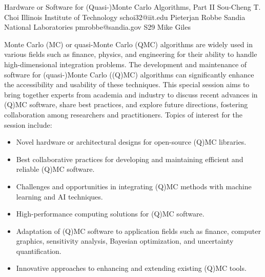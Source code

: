 \begin{session}
 {Hardware or Software for (Quasi-)Monte Carlo Algorithms, Part II}%
 {Sou-Cheng T.  Choi}%
 {Illinois Institute of Technology}%
 {schoi32@iit.edu}%
 {Pieterjan Robbe}%
 {Sandia National Laboratories}%
 {pmrobbe@sandia.gov}%
 {S29}%
 {Mike Giles}%

 Monte Carlo (MC) or quasi-Monte Carlo (QMC) algorithms are widely used in various fields such as finance, physics, and engineering for their ability to handle high-dimensional integration problems. The development and maintenance of software for (quasi-)Monte Carlo ((Q)MC) algorithms can significantly enhance the accessibility and usability of these techniques. This special session aims to bring together experts from academia and industry to discuss recent advances in (Q)MC software, share best practices, and explore future directions, fostering collaboration among researchers and practitioners.
 Topics of interest for the session include:
 \begin{itemize}
 \item Novel hardware or architectural designs for open-source (Q)MC libraries.
 \item Best collaborative practices for developing and maintaining efficient and reliable (Q)MC software.
 \item Challenges and opportunities in integrating (Q)MC methods with machine learning and AI techniques.
 \item High-performance computing solutions for (Q)MC software.
 \item Adaptation of (Q)MC software to application fields such as finance, computer graphics, sensitivity analysis, Bayesian optimization, and uncertainty quantification.
 \item Innovative approaches to enhancing and extending existing (Q)MC tools.
 \end{itemize}
 \medskip
\end{session}



